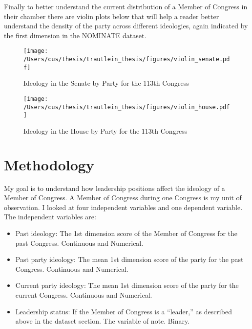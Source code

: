 \documentclass[12pt,twoside]{reedthesis}
\begin{document}
  Finally to better understand the current distribution of a Member of
  Congress in their chamber there are violin plots below that will help a
  reader better understand the density of the party across different
  ideologies, again indicated by the first dimension in the NOMINATE
  dataset.
  
  \begin{figure}[h!tbp]
  \centering
  \texttt{[image: /Users/cus/thesis/trautlein\_thesis/figures/violin\_senate.pdf]}
  \caption[Ideology in the Senate by Party for the 113th Congress]{\normalsize{Ideology in the Senate by Party for the 113th Congress}}
  \label{fig:def}
  \end{figure}
  
  \begin{figure}[h!tbp]
  \centering
  \texttt{[image: /Users/cus/thesis/trautlein\_thesis/figures/violin\_house.pdf]}
  \caption[Ideology in the House by Party for the 113th Congress]{\normalsize{Ideology in the House by Party for the 113th Congress}}
  \label{fig:def}
  \end{figure}
  
  \section{Methodology}\label{methodology}
  
  My goal is to understand how leadership positions affect the ideology of
  a Member of Congress. A Member of Congress during one Congress is my
  unit of observation. I looked at four independent variables and one
  dependent variable. The independent variables are:
  
  \begin{itemize}
  \itemsep1pt\parskip0pt
  \item
    Past ideology: The 1st dimension score of the Member of Congress for
    the past Congress. Continuous and Numerical.
  \item
    Past party ideology: The mean 1st dimension score of the party for the
    past Congress. Continuous and Numerical.
  \item
    Current party ideology: The mean 1st dimension score of the party for
    the current Congress. Continuous and Numerical.
  \item
    Leadership status: If the Member of Congress is a ``leader,'' as
    described above in the dataset section. The variable of note. Binary.
  \end{itemize}
  
\end{document}
